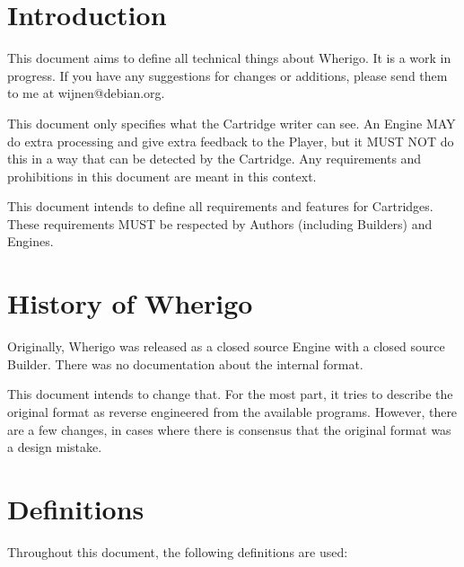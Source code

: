 \documentclass{article}
\begin{document}
\section{Introduction}
This document aims to define all technical things about Wherigo. It is a work
in progress. If you have any suggestions for changes or additions, please send
them to me at wijnen@debian.org.

This document only specifies what the Cartridge writer can see. An Engine MAY
do extra processing and give extra feedback to the Player, but it MUST NOT do
this in a way that can be detected by the Cartridge. Any requirements and
prohibitions in this document are meant in this context.

This document intends to define all requirements and features for Cartridges.
These requirements MUST be respected by Authors (including Builders) and
Engines.


\section{History of Wherigo}
Originally, Wherigo was released as a closed source Engine with a closed source
Builder. There was no documentation about the internal format.

This document intends to change that. For the most part, it tries to describe
the original format as reverse engineered from the available programs. However,
there are a few changes, in cases where there is consensus that the original
format was a design mistake.


\section{Definitions}
Throughout this document, the following definitions are used:
\end{document}
